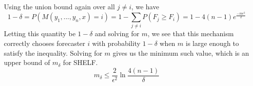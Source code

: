 \documentclass[letterpaper,12pt]{article}
\newcommand{\1}{\mathbbm{1}}
\begin{document}
Using the union bound again over all $j \neq i$, we have 
\[
1 - \delta = P(M(y_1, ..., y_n, x) = i) = 1 - \sum_{j \neq i} P(F_j \geq F_i) = 1 - 4 (n-1) e^{\frac{- m \epsilon^2}{2}}
\]
Letting this quantity be $1 - \delta$ and solving for $m$, we see that this mechanism correctly chooses forecaster $i$ with probability $1 - \delta$ when $m$ is large enough to satisfy the inequality. Solving for $m$ gives us the minimum such value, which is an upper bound of $m_\delta$ for SHELF.
\[ m_\delta \leq \frac{2}{\epsilon^2} \ln \frac{4(n-1)}{\delta} \]



\end{document}
